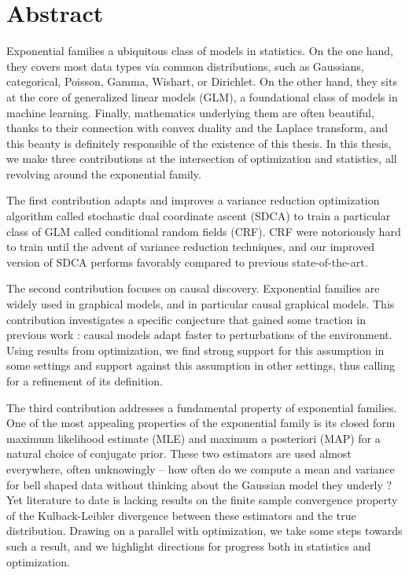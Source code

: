 \documentclass[12pt]{report} %
\numberwithin{equation}{chapter}
\numberwithin{table}{chapter}
\numberwithin{figure}{chapter}
\begin{document}

\chapter*{Abstract}

Exponential families a ubiquitous class of models in statistics. 
On the one hand, they covers most data types via common distributions, such as Gaussians, categorical, Poisson, Gamma, Wishart, or Dirichlet. 
On the other hand, they sits at the core of generalized linear models (GLM), a foundational class of models in machine learning. 
Finally, mathematics underlying them are often beautiful, thanks to their connection with convex duality and the Laplace transform, and this beauty is definitely responsible of the existence of this thesis.
In this thesis, we make three contributions at the intersection of optimization and statistics, all revolving around the exponential family. 

The first contribution adapts and improves a variance reduction optimization algorithm called stochastic dual coordinate ascent (SDCA) to train a particular class of GLM called conditional random fields (CRF). CRF were notoriously hard to train until the advent of variance reduction techniques, and our improved version of SDCA performs favorably compared to previous state-of-the-art.  

The second contribution focuses on causal discovery. 
Exponential families are widely used in graphical models, and in particular causal graphical models. 
This contribution investigates a specific conjecture that gained some traction in previous work : causal models adapt faster to perturbations of the environment. Using results from optimization, we find strong support for this assumption in some settings and support against this assumption in other settings, thus calling for a refinement of its definition.

The third contribution addresses a fundamental property of exponential families. 
One of the most appealing properties of the exponential family is its closed form maximum likelihood estimate (MLE) and maximum a posteriori (MAP) for a natural choice of conjugate prior. These two estimators are used almost everywhere, often unknowingly
-- how often do we compute a mean and variance for bell shaped data without thinking about the Gaussian model they underly ?
Yet literature to date is lacking results on the finite sample convergence property of the Kulback-Leibler divergence between these estimators and the true distribution. Drawing on a parallel with optimization, we take some steps towards such a result, and we highlight directions for progress both in statistics and optimization. 
\end{document}
